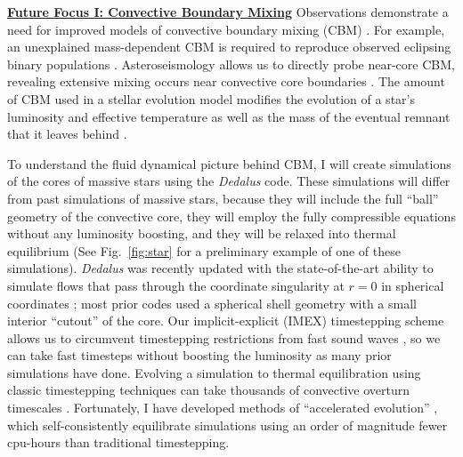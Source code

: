 \documentclass[12pt]{article}
\newcommand{\sct}[1]{\vspace{0.3cm}\hspace{-\parindent}\textbf{\underline{#1}}\hspace{0.3cm}}
\begin{document}
\newpage
\sct{Future Focus I: Convective Boundary Mixing}
Observations demonstrate a need for improved models of convective boundary mixing (CBM) \citep{johnston2021}.
For example, an unexplained mass-dependent CBM is required to reproduce observed eclipsing binary populations  \citep{claret_torres_2019}.
Asteroseismology allows us to directly probe near-core CBM, revealing extensive mixing occurs near convective core boundaries \citep{michielsen_etal_2019, pedersen_etal_2021}.
The amount of CBM used in a stellar evolution model modifies the evolution of a star's luminosity and effective temperature as well as the mass of the eventual remnant that it leaves behind \citep{castro_etal_2014,higgins_vink_2019}.


To understand the fluid dynamical picture behind CBM, I will create simulations of the cores of massive stars using the \emph{Dedalus} \citep{burns_etal_2020} code.
These simulations will differ from past simulations of massive stars, because they will include the full ``ball'' geometry of the convective core, they will employ the fully compressible equations without any luminosity boosting, and they will be relaxed into thermal equilibrium (See Fig.~\ref{fig:star} for a preliminary example of one of these simulations).
\emph{Dedalus} was recently updated with the state-of-the-art ability to simulate flows that pass through the coordinate singularity at $r = 0$ in spherical coordinates \citep{vasil_etal_2019,lecoanet_etal_2019}; most prior codes used a spherical shell geometry with a small interior ``cutout'' of the core.
Our implicit-explicit (IMEX) timestepping scheme allows us to circumvent timestepping restrictions from fast sound waves \citep{anders_brown_2017}, so we can take fast timesteps without boosting the luminosity as many prior simulations have done.
Evolving a simulation to thermal equilibration using classic timestepping techniques can take thousands of convective overturn timescales \citep{anders_etal_2022a,anders_etal_2022b}.
Fortunately, I have developed methods of ``accelerated evolution'' \citep{anders_etal_2018}, which self-consistently equilibrate simulations using an order of magnitude fewer cpu-hours than traditional timestepping.
\end{document}
